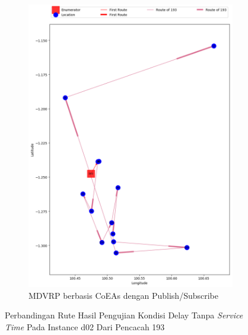 \begin{figure}[H]\ContinuedFloat
	\centering
	\begin{subfigure}[t]{\textwidth}
		\centering
		\includegraphics[width=\textwidth]{Resources/Images/delayed_2/real_m15_n100_delayed_2_193_pubsub_coes}
		\caption{MDVRP berbasis CoEAs dengan Publish/Subscribe}
		\label{fig:real_m15_n100_delayed_2_193_pubsub_coes}
	\end{subfigure}
	\caption{Perbandingan Rute Hasil Pengujian Kondisi Delay Tanpa \textit{Service Time} Pada Instance d02 Dari Pencacah 193}
	\label{fig:real_m15_n100_delayed_2_193_contd}
\end{figure}


